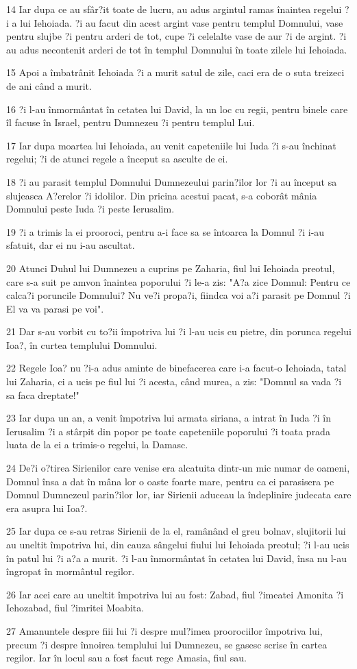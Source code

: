 \par 14 Iar dupa ce au sfâr?it toate de lucru, au adus argintul ramas înaintea regelui ?i a lui Iehoiada. ?i au facut din acest argint vase pentru templul Domnului, vase pentru slujbe ?i pentru arderi de tot, cupe ?i celelalte vase de aur ?i de argint. ?i au adus necontenit arderi de tot în templul Domnului în toate zilele lui Iehoiada.
\par 15 Apoi a îmbatrânit Iehoiada ?i a murit satul de zile, caci era de o suta treizeci de ani când a murit.
\par 16 ?i l-au înmormântat în cetatea lui David, la un loc cu regii, pentru binele care îl facuse în Israel, pentru Dumnezeu ?i pentru templul Lui.
\par 17 Iar dupa moartea lui Iehoiada, au venit capeteniile lui Iuda ?i s-au închinat regelui; ?i de atunci regele a început sa asculte de ei.
\par 18 ?i au parasit templul Domnului Dumnezeului parin?ilor lor ?i au început sa slujeasca A?erelor ?i idolilor. Din pricina acestui pacat, s-a coborât mânia Domnului peste Iuda ?i peste Ierusalim.
\par 19 ?i a trimis la ei prooroci, pentru a-i face sa se întoarca la Domnul ?i i-au sfatuit, dar ei nu i-au ascultat.
\par 20 Atunci Duhul lui Dumnezeu a cuprins pe Zaharia, fiul lui Iehoiada preotul, care s-a suit pe amvon înaintea poporului ?i le-a zis: "A?a zice Domnul: Pentru ce calca?i poruncile Domnului? Nu ve?i propa?i, fiindca voi a?i parasit pe Domnul ?i El va va parasi pe voi".
\par 21 Dar s-au vorbit cu to?ii împotriva lui ?i l-au ucis cu pietre, din porunca regelui Ioa?, în curtea templului Domnului.
\par 22 Regele Ioa? nu ?i-a adus aminte de binefacerea care i-a facut-o Iehoiada, tatal lui Zaharia, ci a ucis pe fiul lui ?i acesta, când murea, a zis: "Domnul sa vada ?i sa faca dreptate!"
\par 23 Iar dupa un an, a venit împotriva lui armata siriana, a intrat în Iuda ?i în Ierusalim ?i a stârpit din popor pe toate capeteniile poporului ?i toata prada luata de la ei a trimis-o regelui, la Damasc.
\par 24 De?i o?tirea Sirienilor care venise era alcatuita dintr-un mic numar de oameni, Domnul însa a dat în mâna lor o oaste foarte mare, pentru ca ei parasisera pe Domnul Dumnezeul parin?ilor lor, iar Sirienii aduceau la îndeplinire judecata care era asupra lui Ioa?.
\par 25 Iar dupa ce s-au retras Sirienii de la el, ramânând el greu bolnav, slujitorii lui au uneltit împotriva lui, din cauza sângelui fiului lui Iehoiada preotul; ?i l-au ucis în patul lui ?i a?a a murit. ?i l-au înmormântat în cetatea lui David, însa nu l-au îngropat în mormântul regilor.
\par 26 Iar acei care au uneltit împotriva lui au fost: Zabad, fiul ?imeatei Amonita ?i Iehozabad, fiul ?imritei Moabita.
\par 27 Amanuntele despre fiii lui ?i despre mul?imea proorociilor împotriva lui, precum ?i despre înnoirea templului lui Dumnezeu, se gasesc scrise în cartea regilor. Iar în locul sau a fost facut rege Amasia, fiul sau.

